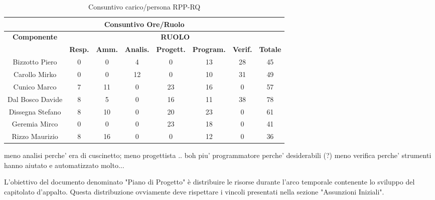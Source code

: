 \begin{table}[!h]
	\begin{center}
		  \begin{tabular}
			  {|c|c|c|c|c|c|c|c|}
		 \hline
			\multicolumn{8}{|c|}{ \textbf{Consuntivo Ore/Ruolo} } \\
			\hline
			\textbf{Componente} & \multicolumn{7}{|c|}{ \textbf{RUOLO} } \\
			\hline
			& \textbf{Resp.} & \textbf{Amm.} & \textbf{Analis.} & \textbf{Progett.} & \textbf{Program.} & \textbf{Verif.}  & \textbf{Totale}\\
			\hline
			Bizzotto Piero 		&  0  &  0  &  4  &  0  &  13 &  28 &  45 \\ %
			\hline
			Carollo Mirko 		&  0  &  0  &  12 &  0  &  10 &  31 &  49\\ %
			\hline
			Cunico Marco    	&  7  &  11 &  0  &  23 &  16 &  0  &  57\\ %
			\hline
			Dal Bosco Davide   	&  8  &  5  &  0  &  16 &  11 &  38 &  78\\ %
			\hline
			Dissegna Stefano    &  8  &  10 &  0  &  20 &  23 &  0  &  61\\ %
			\hline
			Geremia Mirco   	&  0  &  0  &  0  &  23 &  18 &  0  &  41\\ %
			\hline	
			Rizzo Maurizio  	&  8  &  16 &  0  &  0  &  12 &  0  &  36\\ %
			\hline	
		\end{tabular}
	\caption{Consuntivo carico/persona RPP-RQ} %
	\label{tab: ConsPersOre_RPP-RQ}
	\end{center}	
\end{table}

meno analisi perche' era di cuscinetto;
meno progettista .. boh
piu' programmatore perche' desiderabili (?)
meno verifica perche' strumenti hanno aiutato e automatizzato molto...

\newpage

L'obiettivo del documento denominato "Piano di Progetto" \`e distribuire le risorse durante l'arco temporale 
contenente lo sviluppo del capitolato d'appalto. Questa distribuzione ovviamente deve rispettare i vincoli presentati 
nella sezione "Assunzioni Iniziali".

